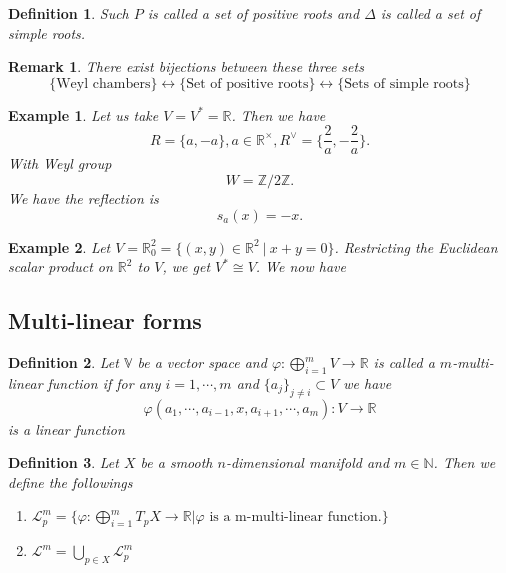 \documentclass{article}
\newtheorem{definition}{Definition}[section]
\newtheorem{remark}{Remark}[section]
\newtheorem{example}{Example}[section]
\numberwithin{equation}{section}
\begin{document}
\begin{definition}
Such $P$ is called a set of positive roots and $\Delta$ is called a set of simple roots.
\end{definition}

\begin{remark}
There exist bijections between these three sets
\begin{equation*}
\{\text{Weyl chambers}\}\leftrightarrow\{\text{Set of positive roots}\}\leftrightarrow\{\text{Sets of simple roots}\}
\end{equation*}
\end{remark}

\begin{example}
Let us take $V=V^*=\mathbb{R}$. Then we have
\begin{equation*}
R = \{a,-a\},a\in\mathbb{R}^\times, R^\lor = \{{\frac 2 a}, -{\frac 2 a}\}.
\end{equation*}
With Weyl group
\begin{equation*}
W = \mathbb{Z}/2\mathbb{Z}.
\end{equation*}
We have the reflection is 
\begin{equation*}
s_a(x) = -x.
\end{equation*}
\end{example}

\begin{example}
Let $V=\mathbb{R}^2_0 = \{(x,y)\in\mathbb{R}^2\:|\: x+y=0\}$.  Restricting the Euclidean scalar product on $\mathbb{R}^2$ to $V$, we get $V^*\cong V$. We now have
\end{example}

\subsection{Multi-linear forms}
\begin{definition}
Let $\mathbb{V}$ be a vector space and $\varphi:\bigoplus_{i=1}^mV\to\mathbb{R}$ is called a $m$-multi-linear function if for any $i=1,\cdots,m$ and $\{a_j\}_{j\not=i}\subset V$ we have
\begin{equation*}
\varphi(a_1,\cdots,a_{i-1},x,a_{i+1},\cdots,a_m):V\to\mathbb{R}
\end{equation*}
is a linear function
\end{definition}

\begin{definition}
Let $X$ be a smooth $n$-dimensional manifold and $m\in\mathbb{N}$. Then we define the followings
\begin{enumerate}
\item $\mathcal{L}^m_p=\{\varphi:\bigoplus_{i=1}^mT_pX\to\mathbb{R}|\varphi \text{ is a m-multi-linear function.}\}$
\item $\mathcal{L}^m=\bigcup_{p\in X}\mathcal{L}^m_p$
\end{enumerate}
\end{definition}
\end{document}
